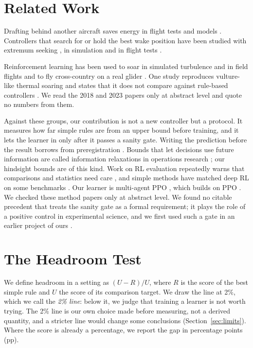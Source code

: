\documentclass[11pt]{article}
\begin{document}
\section{Related Work}
\label{sec:related}

Drafting behind another aircraft saves energy in flight tests and models \citep{maskew1977,ray2002}.
Controllers that search for or hold the best wake position have been studied with extremum seeking \citep{binetti2003}, in simulation \citep{rossato2024} and in flight tests \citep{hanson2018}.

Reinforcement learning has been used to soar in simulated turbulence and in field flights \citep{reddy2016,reddy2018} and to fly cross-country on a real glider \citep{notter2023}.
One study reproduces vulture-like thermal soaring and states that it does not compare against rule-based controllers \citep{flato2024}.
We read the 2018 and 2023 papers only at abstract level and quote no numbers from them.

Against these groups, our contribution is not a new controller but a protocol.
It measures how far simple rules are from an upper bound before training, and it lets the learner in only after it passes a sanity gate.
Writing the prediction before the result borrows from preregistration \citep{nosek2018prereg}.
Bounds that let decisions use future information are called information relaxations in operations research \citep{brown2010information}; our hindsight bounds are of this kind.
Work on RL evaluation repeatedly warns that comparisons and statistics need care \citep{henderson2018matters,agarwal2021precipice}, and simple methods have matched deep RL on some benchmarks \citep{mania2018random,rajeswaran2017simplicity}.
Our learner is multi-agent PPO \citep{yu2022mappo}, which builds on PPO \citep{schulman2017ppo}.
We checked these method papers only at abstract level.
We found no citable precedent that treats the sanity gate as a formal requirement; it plays the role of a positive control in experimental science, and we first used such a gate in an earlier project of ours \citep{ho2026ladder}.

\section{The Headroom Test}
\label{sec:test}

We define headroom in a setting as $(U-R)/U$, where $R$ is the score of the best simple rule and $U$ the score of its comparison target.
We draw the line at 2\%, which we call the \emph{2\% line}: below it, we judge that training a learner is not worth trying.
The 2\% line is our own choice made before measuring, not a derived quantity, and a stricter line would change some conclusions (Section~\ref{sec:limits}).
Where the score is already a percentage, we report the gap in percentage points (pp).
\end{document}

